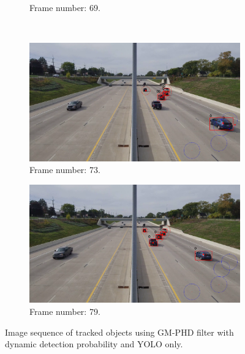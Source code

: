 \begin{figure}[H]
\begin{subfigure}{0.48\textwidth}
        \caption{Frame number: 69.}
        \label{fig:E1-V1-S1:06}
    \end{subfigure}
    \\
    \begin{subfigure}{0.48\textwidth}
        \centering
        \includegraphics[width=\linewidth]{../../../experiments/E1/V1/YOLO/73}
        \caption{Frame number: 73.}
        \label{fig:E1-V1-S1:07}
    \end{subfigure}
    \begin{subfigure}{0.48\textwidth}
        \centering
        \includegraphics[width=\linewidth]{../../../experiments/E1/V1/YOLO/79}
        \caption{Frame number: 79.}
        \label{fig:E1-V1-S1:08}
    \end{subfigure}
    \caption{Image sequence of tracked objects using GM-PHD filter with dynamic detection probability and YOLO only.}
    \label{fig:E1-V1-S1}
\end{figure}







